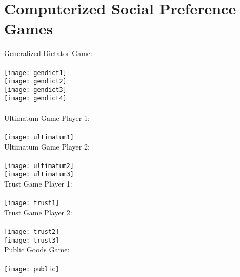 \section{Computerized Social Preference Games}
\vspace{8mm} 
\noindent Generalized Dictator Game:\\ \\
\texttt{[image: gendict1]}\\
\texttt{[image: gendict2]}\\
\texttt{[image: gendict3]}\\
\texttt{[image: gendict4]}\\ \\
\newpage
\noindent Ultimatum Game Player 1: \\ \\
\texttt{[image: ultimatum1]} \\ 
\noindent Ultimatum Game Player 2: \\ \\
\texttt{[image: ultimatum2]} \\
\texttt{[image: ultimatum3]} \\ 
\newpage
\noindent Trust Game Player 1: \\ \\
\texttt{[image: trust1]} \\ 
\noindent Trust Game Player 2: \\ \\
\texttt{[image: trust2]} \\
\texttt{[image: trust3]} \\ 
\newpage
\noindent Public Goods Game: \\ \\
\texttt{[image: public]} \\